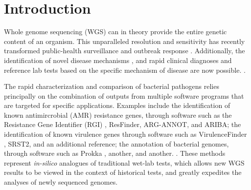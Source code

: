 \documentclass{article}
\begin{document}
\section{Introduction}

Whole genome sequencing (WGS) can in theory provide the entire genetic content of an organism. This unparalleled resolution and sensitivity has recently transformed public-health surveillance and outbreak response \cite{ronholm2016navigating,lytsy2017time}. Additionally, the identification of novel disease mechanisms \cite{wang2014whole,yuen2015whole}, and rapid clinical diagnoses and reference lab tests based on the specific mechanism of disease are now possible. \cite{willig2015whole,dewey2014clinical}.

The rapid characterization and comparison of bacterial pathogens relies principally on the combination of outputs from multiple software programs that are targeted for specific applications. Examples include the identification of known antimircrobial (AMR) resistance genes, through software such as the Resistance Gene Identifier (RGI) \cite{mcarthur2013comprehensive}, {ResFinder}, {ARG-ANNOT}, and {ARIBA}; the identification of known virulence genes through software such as VirulenceFinder \cite{kleinheinz2014applying}, {SRST2}, and {an additional reference}; the annotation of bacterial genomes, through software such as Prokka \cite{doi:10.1093/bioinformatics/btu153}, {another}, and {another}. . These methods represent \textit{in-silico} analogues of traditional wet-lab tests, which allows new WGS results to be viewed in the context of historical tests, and greatly expedites the analyses of newly sequenced genomes. 
\end{document}
